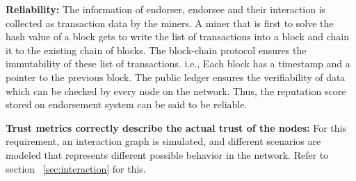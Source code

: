 \textbf{Reliability:}
The information of endorser, endorsee and their interaction is collected as
transaction data by the miners. A miner that is first to solve the hash value
of a block gets to write the list of transactions into a block and chain it to
the existing chain of blocks. The block-chain protocol ensures the immutability
of these list of transactions. i.e., Each block has a timestamp and a pointer
to the previous block. The public ledger ensures the verifiability of data
which can be checked by every node on the network.  Thus, the reputation score
stored on endorsement system can be said to be reliable. 

%

\textbf{Trust metrics correctly describe the actual trust of the nodes:} For
this requirement, an interaction graph is simulated, and different scenarios
are modeled that represents different possible behavior in the network.  Refer
to section ~\ref{sec:interaction} for this.

